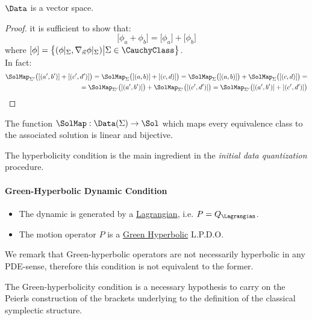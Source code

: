 \documentclass[Main]{subfiles}
\begin{document}
			\begin{proposition}
				$\Data$ is a vector space.
			\end{proposition}
			\begin{proof}
				it is sufficient to show that:
				\begin{displaymath}
					\big[ \phi_a + \phi_b \big] = \big[ \phi_a \big] + \big[ \phi_b \big]
				\end{displaymath}
				where $[\phi]= \big\{(\phi\vert_\Sigma , \nabla_{\vec{n}}\phi \vert_\Sigma) \big\vert \Sigma \in \CauchyClass \big\}$.
				\\
				In fact:
				\begin{align*}
					 \SolMap_{\Sigma'}\big([(a',b')] + [(c',d')] \big)=\SolMap_\Sigma\big([(a,b)] + [(c,d)] \big) = \SolMap_\Sigma\big([(a,b)] \big)+ \SolMap_\Sigma\big([(c,d)] \big) =\\
					 =\SolMap_{\Sigma'}\big([(a',b')] \big)+ \SolMap_{\Sigma'}\big([(c',d')] \big) = \SolMap_{\Sigma'}\big([(a',b')] +[(c',d')] \big)
				\end{align*}

			\end{proof}
			\begin{corollary}
				The function  $ 	 \SolMap : \Data (\Sigma ) \rightarrow \Sol $ which maps every equivalence class to the associated solution is linear and bijective.
			\end{corollary}
		\begin{observation}
		
			The hyperbolicity condition  is the main ingredient in the \emph{initial data quantization} procedure\cite{Wald1994}.	
		\end{observation}	
			
		\paragraph{Green-Hyperbolic Dynamic Condition}
		\begin{itemize}
			\item The dynamic is generated by a \underline{Lagrangian}, i.e.  $P= Q_\Lagrangian$.
			\item The motion operator $P$ is a \underline{Green Hyperbolic} L.P.D.O.
		\end{itemize}
		We remark that Green-hyperbolic operators are not necessarily hyperbolic in any PDE-sense, therefore 
		this condition is not equivalent to the former.
		\begin{observation}
		
			The Green-hyperbolicity condition is a necessary hypothesis to carry on the Peierls construction of the brackets underlying to the definition of the classical symplectic structure.
		\end{observation}	
			 
\end{document}
